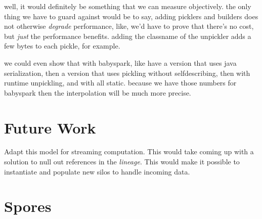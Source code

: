\documentclass[preprint]{sigplanconf}
\theoremstyle{definition}
\theoremstyle{definition}
\begin{document}
well, it would definitely be something that we can measure objectively. the
only thing we have to guard against would be to say, adding picklers and
builders does not otherwise \emph{degrade} performance, like, we'd have to
prove that there's no cost, but \emph{just} the performance benefits. adding
the classname of the unpickler adds a few bytes to each pickle, for example.

we could even show that with babyspark, like have a version that uses java
serialization, then a version that uses pickling without selfdescribing, then
with runtime unpickling, and with all static. because we have those numbers
for babyspark then the interpolation will be much more precise.



\section{Future Work}

Adapt this model for streaming computation. This would take coming up with a
solution to null out references in the {\em lineage}. This would make it possible to instantiate and populate new silos to handle incoming data.

\appendix
\section{Spores}
\label{appendix:spores}











\end{document}
